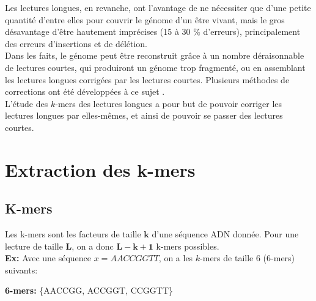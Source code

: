 \documentclass{report}
\begin{document}
    Les lectures longues, en revanche, ont l'avantage de ne nécessiter que d'une petite quantité d'entre elles pour couvrir le génome d'un être vivant, mais le gros désavantage d'être hautement imprécises (15 à 30 \% d'erreurs), principalement des erreurs d'insertions et de délétion.\\

    Dans les faits, le génome peut être reconstruit grâce à un nombre déraisonnable de lectures courtes, qui produiront un génome trop fragmenté, ou en assemblant les lectures longues corrigées par les lectures courtes. Plusieurs méthodes de corrections ont été développées à ce sujet \cite{Morisse2017}.\\

    L'étude des $k$-mers des lectures longues a pour but de pouvoir corriger les lectures longues par elles-mêmes, et ainsi de pouvoir se passer des lectures courtes.
    \newpage
  \chapter{Extraction des k-mers}
    \section{K-mers}
      Les k-mers sont les facteurs de taille $\mathbf{k}$ d'une séquence ADN donnée. Pour une lecture de taille $\mathbf{L}$, on a donc $\mathbf{L - k + 1}$ k-mers possibles.\bigskip\\
      \textbf{Ex:} Avec une séquence $x = AACCGGTT$, on a les $k$-mers de taille $6$ ($6$-mers) suivants:\\
      \begin{center}\end{center}
      \textbf{6-mers:} \{AACCGG, ACCGGT, CCGGTT\}\bigskip\\
\end{document}
